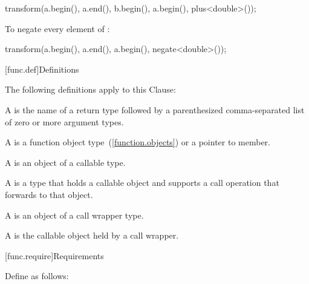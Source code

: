 \begin{codeblock}
transform(a.begin(), a.end(), b.begin(), a.begin(), plus<double>());
\end{codeblock}
\exitexample

\pnum
\enterexample
To negate every element of :

\begin{codeblock}
transform(a.begin(), a.end(), a.begin(), negate<double>());
\end{codeblock}

\exitexample

[func.def]{Definitions}

\pnum
The following definitions apply to this Clause:

\pnum
{}%
A  is the name of a return type followed by a
parenthesized comma-separated list of zero or more argument types.

\pnum
{}%
A  is a function object type~(\ref{function.objects}) or a pointer to member.

\pnum
{}%
A  is an object of a callable type.

\pnum
{}%
A  is a type that holds a callable object
and supports a call operation that forwards to that object.

\pnum
{}%
A  is an object of a call wrapper type.

\pnum
{}%
A  is the callable object held by a call wrapper.

[func.require]{Requirements}

\pnum
{}%
Define  as follows:


